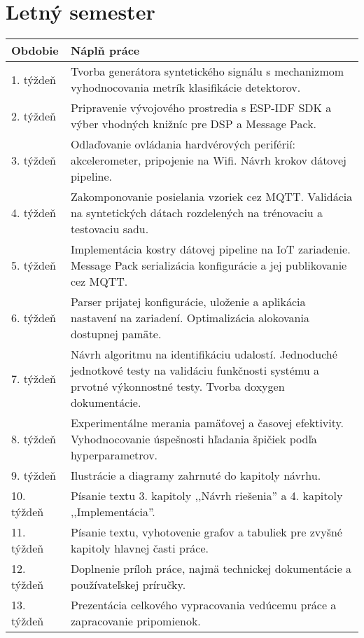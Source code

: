 \section{Letný semester}
\begin{table}[h!]
\def\arraystretch{1.25}
\begin{tabular}{|l|p{12cm}|}
\hline
\textbf{Obdobie} & \textbf{Náplň práce}                                                                                                                                            \\ \hline
1. týždeň        & Tvorba generátora syntetického signálu s mechanizmom vyhodnocovania metrík  klasifikácie detektorov.                                                            \\ \hline
2. týždeň        & Pripravenie vývojového prostredia s ESP-IDF SDK a výber  vhodných knižníc  pre DSP a Message Pack.                                                              \\ \hline
3. týždeň        & Odlaďovanie ovládania hardvérových periférií: akcelerometer, pripojenie na Wifi.  Návrh krokov dátovej pipeline.                                                \\ \hline
4. týždeň        & Zakomponovanie posielania vzoriek cez MQTT. Validácia na syntetických dátach rozdelených na trénovaciu a testovaciu sadu.                                       \\ \hline
5. týždeň        & Implementácia kostry dátovej pipeline na IoT zariadenie. Message Pack serializácia  konfigurácie a jej publikovanie  cez MQTT. \\ \hline
6. týždeň        & Parser prijatej konfigurácie, uloženie a aplikácia nastavení na zariadení.  Optimalizácia alokovania dostupnej pamäte.                                          \\ \hline
7. týždeň        & Návrh algoritmu na identifikáciu udalostí. Jednoduché jednotkové testy na validáciu funkčnosti systému a prvotné výkonnostné testy. Tvorba doxygen dokumentácie. \\ \hline
8. týždeň        & Experimentálne merania pamäťovej a časovej efektivity. Vyhodnocovanie úspešnosti hľadania špičiek podľa hyperparametrov. \\ \hline
9. týždeň        & Ilustrácie a diagramy zahrnuté do kapitoly návrhu. \\ \hline
10. týždeň       & Písanie textu 3. kapitoly ,,Návrh riešenia'' a 4. kapitoly ,,Implementácia''. \\ \hline
11. týždeň       & Písanie textu, vyhotovenie grafov a tabuliek pre zvyšné kapitoly  hlavnej časti práce. \\ \hline
12. týždeň       & Doplnenie príloh práce, najmä technickej dokumentácie a  používateľskej príručky.                                                                                 \\ \hline
13. týždeň       & Prezentácia celkového vypracovania vedúcemu práce a zapracovanie pripomienok.                                                                                                           \\ \hline
\end{tabular}
\end{table}

